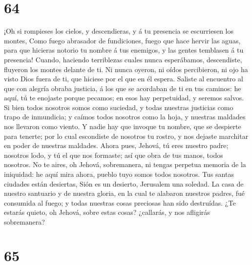 \hypertarget{section-63}{%
\section{64}\label{section-63}}

 ¡Oh si rompieses los cielos, y descendieras, y á tu
presencia se escurriesen los montes,  Como fuego abrasador
de fundiciones, fuego que hace hervir las aguas, para que hicieras
notorio tu nombre á tus enemigos, y las gentes temblasen á tu presencia!
 Cuando, haciendo terriblezas cuales nunca esperábamos,
descendiste, fluyeron los montes delante de ti.  Ni nunca
oyeron, ni oídos percibieron, ni ojo ha visto Dios fuera de ti, que
hiciese por el que en él espera.  Saliste al encuentro al
que con alegría obraba justicia, á los que se acordaban de ti en tus
caminos: he aquí, tú te enojaste porque pecamos; en esos hay
perpetuidad, y seremos salvos.  Si bien todos nosotros
somos como suciedad, y todas nuestras justicias como trapo de
inmundicia; y caímos todos nosotros como la hoja, y nuestras maldades
nos llevaron como viento.  Y nadie hay que invoque tu
nombre, que se despierte para tenerte; por lo cual escondiste de
nosotros tu rostro, y nos dejaste marchitar en poder de nuestras
maldades.  Ahora pues, Jehová, tú eres nuestro padre;
nosotros lodo, y tú el que nos formaste; así que obra de tus manos,
todos nosotros.  No te aires, oh Jehová, sobremanera, ni
tengas perpetua memoria de la iniquidad: he aquí mira ahora, pueblo tuyo
somos todos nosotros.  Tus santas ciudades están
desiertas, Sión es un desierto, Jerusalem una soledad. 
La casa de nuestro santuario y de nuestra gloria, en la cual te alabaron
nuestros padres, fué consumida al fuego; y todas nuestras cosas
preciosas han sido destruídas.  ¿Te estarás quieto, oh
Jehová, sobre estas cosas? ¿callarás, y nos afligirás sobremanera?

\hypertarget{section-64}{%
\section{65}\label{section-64}}

